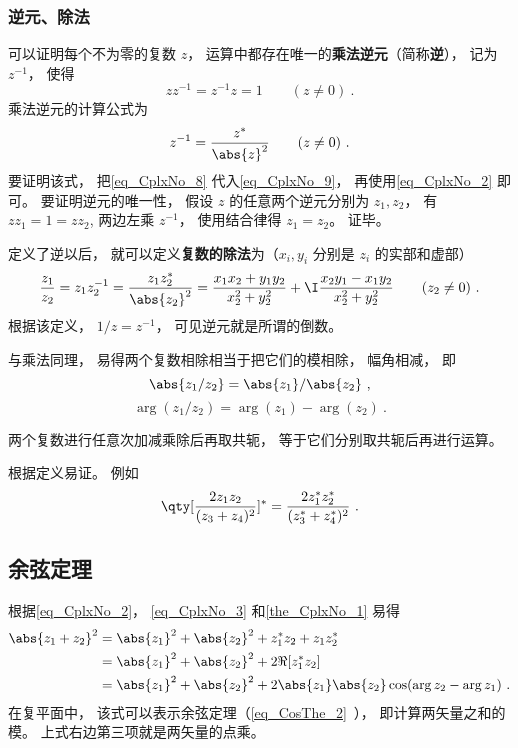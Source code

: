 \subsubsection{逆元、除法}
可以证明每个不为零的复数 $z$， 运算中都存在唯一的\textbf{乘法逆元}（简称\textbf{逆}）， 记为 $z^{-1}$， 使得
\begin{equation}\label{eq_CplxNo_9}
zz^{-1} = z^{-1}z = 1 \qquad (z \ne 0)~.
\end{equation}
乘法逆元的计算公式为
\begin{equation}\label{eq_CplxNo_8}
z^{-1} = \frac{z^*}{\abs{z}^2} \qquad (z \ne 0)~.
\end{equation}
要证明该式， 把\autoref{eq_CplxNo_8} 代入\autoref{eq_CplxNo_9}， 再使用\autoref{eq_CplxNo_2} 即可。 要证明逆元的唯一性， 假设 $z$ 的任意两个逆元分别为 $z_1, z_2$， 有 $zz_1 = 1 = zz_2$, 两边左乘 $z^{-1}$， 使用结合律得 $z_1 = z_2$。 证毕。

定义了逆以后， 就可以定义\textbf{复数的除法}为（$x_i,y_i$ 分别是 $z_i$ 的实部和虚部）
\begin{equation}\label{eq_CplxNo_7}
\frac{z_1}{z_2} = z_1z_2^{-1} = \frac{z_1z_2^*}{\abs{z_2}^2} = \frac{x_1 x_2 + y_1 y_2}{x_2^2 + y_2^2} + \I \frac{x_2 y_1 - x_1 y_2}{x_2^2 + y_2^2} \qquad (z_2 \ne 0)~.
\end{equation}
根据该定义， $1/z = z^{-1}$， 可见逆元就是所谓的倒数。

与乘法同理， 易得两个复数相除相当于把它们的模相除， 幅角相减， 即
\begin{equation}
\abs{z_1/z_2} = \abs{z_1}/\abs{z_2}~,
\end{equation}
\begin{equation}
\arg(z_1/z_2) = \arg(z_1) - \arg(z_2)~.
\end{equation}

\begin{theorem}{}\label{the_CplxNo_1}
两个复数进行任意次加减乘除后再取共轭， 等于它们分别取共轭后再进行运算。
\end{theorem}
根据定义易证。 例如
\begin{equation}
\qty[\frac{2 z_1 z_2}{(z_3 + z_4)^2}]^* = \frac{2 z_1^* z_2^*}{(z_3^* + z_4^*)^2}~.
\end{equation}

\subsection{余弦定理}
根据\autoref{eq_CplxNo_2}， \autoref{eq_CplxNo_3} 和\autoref{the_CplxNo_1} 易得
\begin{equation}
\begin{aligned}
\abs{z_1 + z_2}^2 &= \abs{z_1}^2 + \abs{z_2}^2 + z_1^* z_2 + z_1 z_2^*\\
&= \abs{z_1}^2 + \abs{z_2}^2 + 2\Re[z_1^* z_2]\\
&= \abs{z_1}^2 + \abs{z_2}^2 + 2\abs{z_1}\abs{z_2}\cos(\arg z_2 - \arg z_1)~.
\end{aligned}
\end{equation}
在复平面中， 该式可以表示余弦定理（\autoref{eq_CosThe_2}~）， 即计算两矢量之和的模。 上式右边第三项就是两矢量的点乘。
